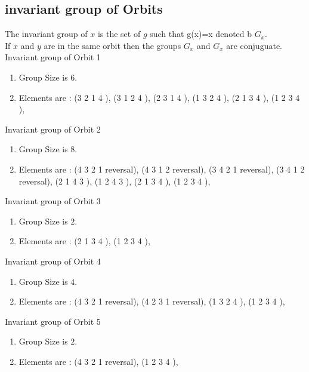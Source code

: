 \documentclass[12pt]{article}
\begin{document}
\subsection{invariant group of Orbits}
\noindent The invariant group of $x$ is the set of $g$ such that g(x)=x denoted b $G_x$.\\
If $x$ and $y$ are in the same orbit then the groups $G_x$ and  $G_x$ are conjuguate.\\
Invariant group of Orbit 1
\begin{enumerate}
\item Group Size is $6$.
\item Elements are : (3 2 1 4  ), (3 1 2 4  ), (2 3 1 4  ), (1 3 2 4  ), (2 1 3 4  ), (1 2 3 4  ), 
\end{enumerate}
Invariant group of Orbit 2
\begin{enumerate}
\item Group Size is $8$.
\item Elements are : (4 3 2 1   reversal), (4 3 1 2   reversal), (3 4 2 1   reversal), (3 4 1 2   reversal), (2 1 4 3  ), (1 2 4 3  ), (2 1 3 4  ), (1 2 3 4  ), 
\end{enumerate}
Invariant group of Orbit 3
\begin{enumerate}
\item Group Size is $2$.
\item Elements are : (2 1 3 4  ), (1 2 3 4  ), 
\end{enumerate}
Invariant group of Orbit 4
\begin{enumerate}
\item Group Size is $4$.
\item Elements are : (4 3 2 1   reversal), (4 2 3 1   reversal), (1 3 2 4  ), (1 2 3 4  ), 
\end{enumerate}
Invariant group of Orbit 5
\begin{enumerate}
\item Group Size is $2$.
\item Elements are : (4 3 2 1   reversal), (1 2 3 4  ), 
\end{enumerate}
\end{document}
